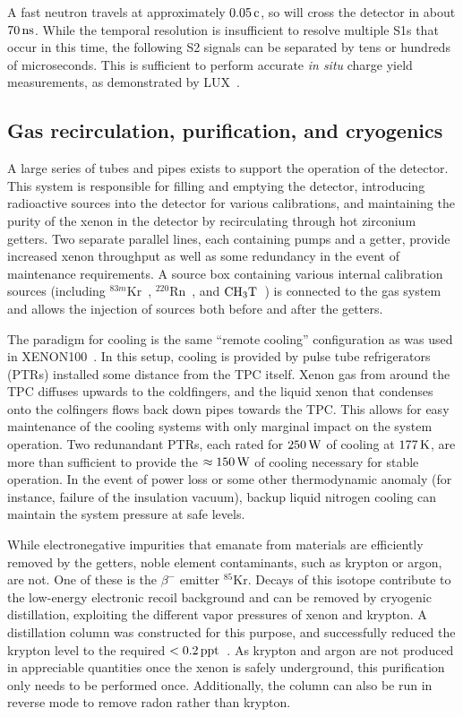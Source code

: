 A fast neutron travels at approximately $0.05\,\mathrm{c}$, so will cross the detector in about $70\,\mathrm{ns}$. While the temporal resolution is insufficient to resolve multiple S1s that occur in this time, the following S2 signals can be separated by tens or hundreds of microseconds. This is sufficient to perform accurate \textit{in situ} charge yield measurements, as demonstrated by LUX~\cite{Akerib:2016mzi}.

\subsection{Gas recirculation, purification, and cryogenics}

A large series of tubes and pipes exists to support the operation of the detector. This system is responsible for filling and emptying the detector, introducing radioactive sources into the detector for various calibrations, and maintaining the purity of the xenon in the detector by recirculating through hot zirconium getters. Two separate parallel lines, each containing pumps and a getter, provide increased xenon throughput as well as some redundancy in the event of maintenance requirements. A source box containing various internal calibration sources (including $^{83m}$Kr~\cite{Kastens:2010,Akerib:2017eql}, $^{220}$Rn~\cite{Aprile:2016pmc,Lang:2016zde}, and $\mathrm{CH}_3\mathrm{T}$~\cite{Akerib:2015wdi}) is connected to the gas system and allows the injection of sources both before and after the getters.

The paradigm for cooling is the same ``remote cooling'' configuration as was used in XENON100~\cite{Aprile:2011dd}. In this setup, cooling is provided by pulse tube refrigerators (PTRs) installed some distance from the TPC itself. Xenon gas from around the TPC diffuses upwards to the coldfingers, and the liquid xenon that condenses onto the colfingers flows back down pipes towards the TPC. This allows for easy maintenance of the cooling systems with only marginal impact on the system operation. Two redunandant PTRs, each rated for $250\,\mathrm{W}$ of cooling at $177\,\mathrm{K}$, are more than sufficient to provide the $\approx 150\,\mathrm{W}$ of cooling necessary for stable operation. In the event of power loss or some other thermodynamic anomaly (for instance, failure of the insulation vacuum), backup liquid nitrogen cooling can maintain the system pressure at safe levels.

While electronegative impurities that emanate from materials are efficiently removed by the getters, noble element contaminants, such as krypton or argon, are not. One of these is the $\beta^-$ emitter $^{85}$Kr. Decays of this isotope contribute to the low-energy electronic recoil background and can be removed by cryogenic distillation, exploiting the different vapor pressures of xenon and krypton. A distillation column was constructed for this purpose, and successfully reduced the krypton level to the required $<0.2\,\mathrm{ppt}$~\cite{Aprile:2015uzo,Aprile:2016xhi}. As krypton and argon are not produced in appreciable quantities once the xenon is safely underground, this purification only needs to be performed once. Additionally, the column can also be run in reverse mode to remove radon rather than krypton.

